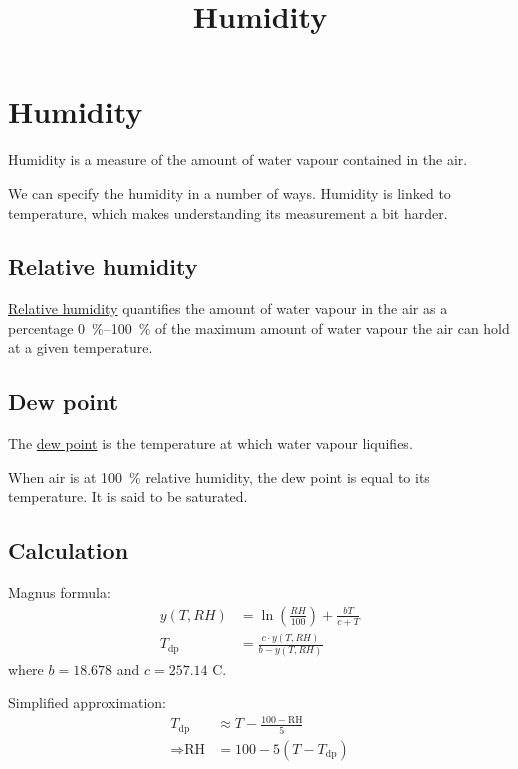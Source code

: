 \documentclass{pgnotes}
\title{Humidity}
\begin{document}
\maketitle

\section{Humidity}

Humidity is a measure of the amount of water vapour contained in the air.

We can specify the humidity in a number of ways.
Humidity is linked to temperature, which makes understanding its measurement a bit harder.

\subsection{Relative humidity}

\href{https://en.wikipedia.org/wiki/Relative_humidity}{Relative humidity} quantifies the amount of water vapour in the air as a percentage \SIrange{0}{100}{\percent} of the maximum amount of water vapour the air can hold at a given temperature.

\subsection{Dew point}

The \href{https://en.wikipedia.org/wiki/Dew_point}{dew point} is the temperature at which water vapour liquifies.

When air is at \SI{100}{\percent} relative humidity, the dew point is equal to its temperature.
It is said to be saturated. 

\subsection{Calculation}

Magnus formula: 
\begin{align}
  y (T, RH) & = \ln \left ( \frac{RH}{100} \right ) + \frac{bT}{c+T} \\
  T_{\mbox{dp}} & = \frac{c \cdot y (T, RH)}{b - y(T, RH)}
\end{align}
where $b = 18.678$ and $c=257.14$ C. 

Simplified approximation:
\begin{align}
  T_{\mbox{dp}} & \approx T - \frac{100-\mbox{RH}}{5} \\
  \Rightarrow \mbox{RH} & = 100 - 5 ( T - T_{\mbox{dp}} ) 
\end{align}
\end{document}
